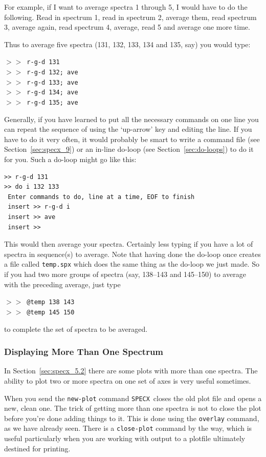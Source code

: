 \documentclass[11pt,twoside]{article}
\newcommand{\SPECX}{{\tt SPECX}}
\newcommand{\SP}{{$>\!>$}}
\begin{document}
For example, if I want to average spectra 1 through 5, I would have
to do the following.  Read in spectrum 1, read in spectrum 2, average
them, read spectrum 3, average again, read spectrum 4, average, read 5
and average one more time.  

Thus to average five spectra (131, 132, 133, 134 and 135, say) you
would type:

\SP\ {\tt r-g-d 131}\\
\SP\ {\tt r-g-d 132; ave}\\
\SP\ {\tt r-g-d 133; ave}\\
\SP\ {\tt r-g-d 134; ave}\\
\SP\ {\tt r-g-d 135; ave}

Generally, if you have learned to put all the necessary commands on
one line you can repeat the sequence of using the `up-arrow' key and
editing the line. If you have to do it very often, it would probably
be smart to write a command file (see Section~\ref{sec:specx_9}) or an
in-line do-loop (see Section~\ref{sec:do-loops}) to do it for
you. Such a do-loop might go like this:
\begin{verbatim}
>> r-g-d 131
>> do i 132 133
 Enter commands to do, line at a time, EOF to finish
 insert >> r-g-d i
 insert >> ave
 insert >>  
\end{verbatim}
This would then average your spectra. Certainly less typing if you
have a lot of spectra in sequence(s) to average. Note that having done
the do-loop once creates a file called {\tt temp.spx} which does the
same thing as the do-loop we just made. So if you had two more groups
of spectra (say, 138--143 and 145--150) to average with the preceding
average, just type 

\SP\ \verb|@temp 138 143|\\
\SP\ \verb|@temp 145 150|

to complete the set of spectra to be averaged. 

\subsubsection{Displaying More Than One Spectrum}
\label{sec:specx_8.3}
In Section~\ref{sec:specx_5.2} there are some plots with more than one
spectra. The ability to plot two or more spectra on one set of axes is
very useful sometimes.

When you send the {\tt new-plot} command \SPECX\ closes the old plot
file and opens a new, clean one.  The trick of getting more than one
spectra is not to close the plot before you're done adding things to
it. This is done using the {\tt overlay} command, as we have already
seen. There is a {\tt close-plot} command by the way, which is useful
particularly when you are working with output to a plotfile ultimately
destined for printing.
\end{document}
